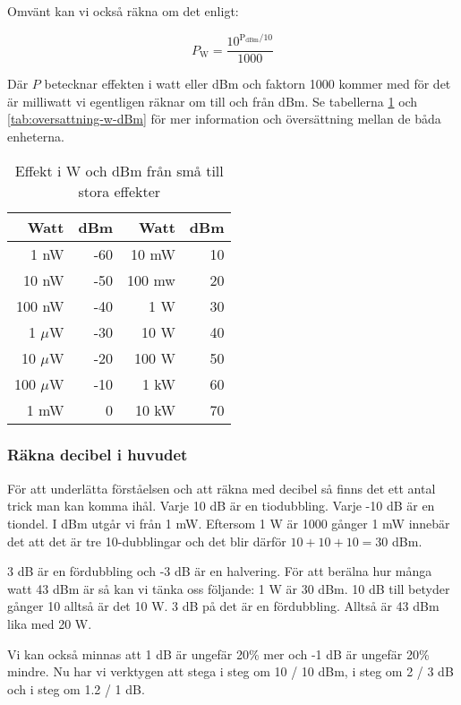 Omvänt kan vi också räkna om det enligt:

\begin{equation}
P_{\mathrm{W}}=\frac{10^{\mathrm{P_{dBm}}/10}}{1000}
\end{equation}

Där $P$ betecknar effekten i watt eller dBm och faktorn 1000 kommer med för det är milliwatt vi egentligen räknar om till och från dBm. Se tabellerna \ref{tab:effekt-dbm} och \ref{tab:oversattning-w-dBm} för mer information och översättning mellan de båda enheterna.

\begin{table}[!h]
	\centering
 	\begin{tabular}{rr|rr}
	      Watt & dBm &   Watt & dBm \\ \hline
	      1 nW & -60 &  10 mW &  10 \\
	     10 nW & -50 & 100 mw &  20 \\
	    100 nW & -40 &    1 W &  30 \\
	  1 $\mu$W & -30 &   10 W &  40 \\
	 10 $\mu$W & -20 &  100 W &  50 \\
	100 $\mu$W & -10 &   1 kW &  60 \\
	      1 mW &   0 &  10 kW &  70
	\end{tabular}
	\caption{Effekt i W och dBm från små till stora effekter}
	\label{tab:effekt-dbm}
\end{table}


\subsubsection{Räkna decibel i huvudet}

För att underlätta förståelsen och att räkna med decibel så finns det ett antal trick man kan komma ihål. Varje 10 dB är en tiodubbling. Varje -10 dB är en tiondel. I dBm utgår vi från 1 mW. Eftersom 1 W är 1000 gånger 1 mW innebär det att det är tre 10-dubblingar och det blir därför $10+10+10=30$ dBm.

3 dB är en fördubbling och -3 dB är en halvering. För att berälna hur många watt 43 dBm är så kan vi tänka oss följande: 1 W är 30 dBm. 10 dB till betyder gånger 10 alltså är det 10 W. 3 dB på det är en fördubbling. Alltså är 43 dBm lika med 20 W. 

Vi kan också minnas att 1 dB är ungefär 20\% mer och -1 dB är ungefär 20\% mindre. Nu har vi verktygen att stega i steg om 10 / 10 dBm, i steg om 2 / 3 dB och i steg om 1.2 / 1 dB.

